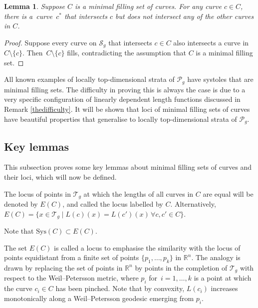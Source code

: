 \documentclass[pdftex]{sigma}
\numberwithin{equation}{section}
\newtheorem{Lemma}[Theorem]{Lemma}
\begin{document}
\begin{Lemma}
Suppose $C$ is a minimal filling set of curves. For any curve $c\in C$, there is a~curve~$c^{*}$ that intersects $c$ but does not intersect any of the other curves in $C$.
\end{Lemma}
\begin{proof}
Suppose every curve on $\mathcal{S}_{g}$ that intersects $c\in C$ also intersects a curve in $C\setminus \{c\}$. Then~${C\setminus \{c\}}$ fills, contradicting the assumption that $C$ is a minimal filling set.
\end{proof}

All known examples of locally top-dimensional strata of $\mathcal{P}_{g}$ have systoles that are minimal filling sets. The difficulty in proving this is always the case is due to a very specific configuration of linearly dependent length functions discussed in Remark \ref{thedifficulty}. It will be shown that loci of minimal filling sets of curves have beautiful properties that generalise to locally top-dimensional strata of $\mathcal{P}_{g}$.

\subsection{Key lemmas}
This subsection proves some key lemmas about minimal filling sets of curves and their loci, which will now be defined.

\begin{Definition}
The locus of points in $\mathcal{T}_{g}$ at which the lengths of all curves in $C$ are equal will be denoted by $E(C)$, and called the locus labelled by $C$. Alternatively,
$E(C)=\{x\in \mathcal{T}_{g} \mid L(c)(x)=L(c')(x) \, \forall c,c'\in C\}$.
\end{Definition}
Note that $\mathrm{Sys}(C)\subset E(C)$.

The set $E(C)$ is called a locus to emphasise the similarity with the locus of points equidistant from a finite set of points $\{p_{1}, \dots, p_{k}\}$ in $\mathbb{R}^{n}$. The analogy is drawn by replacing the set of points in $\mathbb{R}^{n}$ by points in the completion of $\mathcal{T}_{g}$ with respect to the Weil--Petersson metric, where $p_{i}$ for~${i=1, \dots, k}$ is a point at which the curve $c_{i}\in C$ has been pinched. Note that by convexity, $L(c_{i})$ increases monotonically along a Weil--Petersson geodesic emerging from $p_i$.
\end{document}
